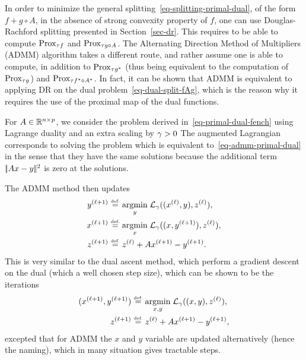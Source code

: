 In order to minimize the general splitting~\eqref{eq-splitting-primal-dual}, of the form $f + g \circ A$,  in the absence of strong convexity property of $f$, one can use Douglas-Rachford splitting presented in Section~\ref{sec-dr}. This requires to be able to compute $\operatorname{Prox}_{\tau f}$ and $\operatorname{Prox}_{\tau g \circ A}$.
%
The Alternating Direction Method of Multipliers (ADMM) algorithm takes a different route, and rather assume one is able to compute, in addition to $\operatorname{Prox}_{\tau g^*}$ (thus being equivalent to the computation of $\operatorname{Prox}_{\tau g}$) and $\operatorname{Prox}_{\tau f^\star\circ A^*}$. In fact, it can be shown that ADMM is equivalent to applying DR on the dual problem~\eqref{eq-dual-split-fAg}, which is the reason why it requires the use of the proximal map of the dual functions. 

For $A \in \mathbb{R}^{n \times p}$, we consider the problem derived in~\eqref{eq-primal-dual-fench} using Lagrange duality and an extra scaling by $\gamma>0$ 
The augmented Lagrangian corresponds to solving the problem
which is equivalent to~\eqref{eq-admm-primal-dual} in the sense that they have the same solutions because the additional term $|\!| Ax-y |\!|^2$ is zero at the solutions.

The ADMM method then updates
\begin{align}
	\label{eq-admm-1}y^{(\ell+1)} &\stackrel{\mbox{\upshape\tiny def.}}{=} \underset{y}{\operatorname{argmin}}\; \mathcal{L}_\gamma( (x^{(\ell)},y),z^{(\ell)}  ), \\
	\label{eq-admm-2}x^{(\ell+1)} &\stackrel{\mbox{\upshape\tiny def.}}{=} \underset{x}{\operatorname{argmin}}\; \mathcal{L}_\gamma( (x,y^{(\ell+1)}),z^{(\ell)}  ), \\
	\label{eq-admm-3}z^{(\ell+1)} &\stackrel{\mbox{\upshape\tiny def.}}{=} z^{(\ell)} + A x^{(\ell+1)}-y^{(\ell+1)}. 
\end{align}
This is very similar to the dual ascent method, which perform a gradient descent on the dual (which a well chosen step size), which can be shown to be the iterations
\begin{align*}
	(x^{(\ell+1)},y^{(\ell+1)}) &\stackrel{\mbox{\upshape\tiny def.}}{=} \underset{x,y}{\operatorname{argmin}}\; \mathcal{L}_\gamma( (x,y),z^{(\ell)}  ), \\
	z^{(\ell+1)} &\stackrel{\mbox{\upshape\tiny def.}}{=} z^{(\ell)} + A x^{(\ell+1)}-y^{(\ell+1)}, 
\end{align*}
excepted that for ADMM the $x$ and $y$ variable are updated alternatively (hence the naming), which in many situation gives tractable steps. 

